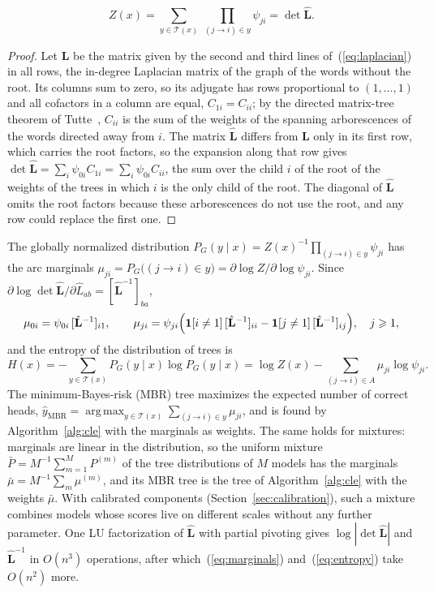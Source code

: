 \documentclass[mathematics,article,submit,pdftex,oneauthor]{Definitions/mdpi}
\newcommand{\T}{\mathcal T}
\newcommand{\Lh}{\hat{\mathbf L}}
\DeclareMathOperator*{\argmax}{arg\,max}
\begin{document}
\begin{Theorem}\label{thm:mt}
\begin{equation}\label{eq:partition}
Z(x)=\sum_{y\in\T(x)}\ \prod_{(j\to i)\in y}\psi_{ji}=\det\Lh.
\end{equation}
\end{Theorem}
\begin{proof}
Let $\mathbf L$ be the matrix given by the second and third lines of~(\ref{eq:laplacian}) in all rows, the in-degree Laplacian matrix of the graph of the words without the root.
Its columns sum to zero, so its adjugate has rows proportional to $(1,\dots,1)$ and all cofactors in a column are equal, $C_{1i}=C_{ii}$; by the directed matrix-tree theorem of Tutte~\cite{Tutte1948}, $C_{ii}$ is the sum of the weights of the spanning arborescences of the words directed away from $i$.
The matrix $\Lh$ differs from $\mathbf L$ only in its first row, which carries the root factors, so the expansion along that row gives $\det\Lh=\sum_i\psi_{0i}C_{1i}=\sum_i\psi_{0i}C_{ii}$, the sum over the child $i$ of the root of the weights of the trees in which $i$ is the only child of the root.
The diagonal of $\Lh$ omits the root factors because these arborescences do not use the root, and any row could replace the first one.
\end{proof}

The globally normalized distribution $P_G(y\mid x)=Z(x)^{-1}\prod_{(j\to i)\in y}\psi_{ji}$ has the arc marginals $\mu_{ji}=P_G\bigl((j\to i)\in y\bigr)=\partial\log Z/\partial\log\psi_{ji}$.
Since $\partial\log\det\Lh/\partial\hat L_{ab}=[\Lh^{-1}]_{ba}$,
\begin{equation}\label{eq:marginals}
\mu_{0i}=\psi_{0i}\,[\Lh^{-1}]_{i1},\qquad
\mu_{ji}=\psi_{ji}\Bigl(\mathbf 1[i\neq1]\,[\Lh^{-1}]_{ii}-\mathbf 1[j\neq1]\,[\Lh^{-1}]_{ij}\Bigr),\quad j\geqslant1,
\end{equation}
and the entropy of the distribution of trees is
\begin{equation}\label{eq:entropy}
H(x)=-\sum_{y\in\T(x)}P_G(y\mid x)\log P_G(y\mid x)=\log Z(x)-\sum_{(j\to i)\in A}\mu_{ji}\log\psi_{ji}.
\end{equation}
The minimum-Bayes-risk (MBR) tree maximizes the expected number of correct heads, $\hat y_{\mathrm{MBR}}=\argmax_{y\in\T(x)}\sum_{(j\to i)\in y}\mu_{ji}$, and is found by Algorithm~\ref{alg:cle} with the marginals as weights.
The same holds for mixtures: marginals are linear in the distribution, so the uniform mixture $\bar P=M^{-1}\sum_{m=1}^{M}P^{(m)}$ of the tree distributions of $M$ models has the marginals $\bar\mu=M^{-1}\sum_m\mu^{(m)}$, and its MBR tree is the tree of Algorithm~\ref{alg:cle} with the weights $\bar\mu$.
With calibrated components (Section~\ref{sec:calibration}), such a mixture combines models whose scores live on different scales without any further parameter.
One LU factorization of $\Lh$ with partial pivoting gives $\log|\det\Lh|$ and $\Lh^{-1}$ in $O(n^3)$ operations, after which~(\ref{eq:marginals}) and~(\ref{eq:entropy}) take $O(n^2)$ more.
\end{document}
